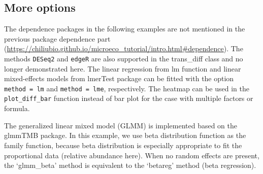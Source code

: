 \documentclass[
]{book}
\newenvironment{Shaded}{\begin{snugshade}}{\end{snugshade}}
\newcommand{\AttributeTok}[1]{\textcolor[rgb]{0.13,0.29,0.53}{#1}}
\newcommand{\CommentTok}[1]{\textcolor[rgb]{0.56,0.35,0.01}{\textit{#1}}}
\newcommand{\ControlFlowTok}[1]{\textcolor[rgb]{0.13,0.29,0.53}{\textbf{#1}}}
\newcommand{\FloatTok}[1]{\textcolor[rgb]{0.00,0.00,0.81}{#1}}
\newcommand{\FunctionTok}[1]{\textcolor[rgb]{0.13,0.29,0.53}{\textbf{#1}}}
\newcommand{\NormalTok}[1]{#1}
\newcommand{\OtherTok}[1]{\textcolor[rgb]{0.56,0.35,0.01}{#1}}
\newcommand{\SpecialCharTok}[1]{\textcolor[rgb]{0.81,0.36,0.00}{\textbf{#1}}}
\newcommand{\StringTok}[1]{\textcolor[rgb]{0.31,0.60,0.02}{#1}}
\begin{document}
\subsection{More options}\label{more-options-1}

The dependence packages in the following examples are not mentioned in the previous package dependence part (\url{https://chiliubio.github.io/microeco_tutorial/intro.html\#dependence}).
The methods \texttt{DESeq2} and \texttt{edgeR} are also supported in the trans\_diff class and no longer demonstrated here.
The linear regression from lm function and linear mixed-effects models from lmerTest package can be fitted with the option \texttt{method\ =\ \textquotesingle{}lm\textquotesingle{}} and \texttt{method\ =\ \textquotesingle{}lme\textquotesingle{}}, respectively.
The heatmap can be used in the \texttt{plot\_diff\_bar} function instead of bar plot for the case with multiple factors or formula.

\begin{Shaded}
\end{Shaded}

The generalized linear mixed model (GLMM) is implemented based on the glmmTMB package.
In this example, we use beta distribution function as the family function,
because beta distribution is especially appropriate to fit the proportional data (relative abundance here).
When no random effects are present, the `glmm\_beta' method is equivalent to the `betareg' method (beta regression).
\end{document}
